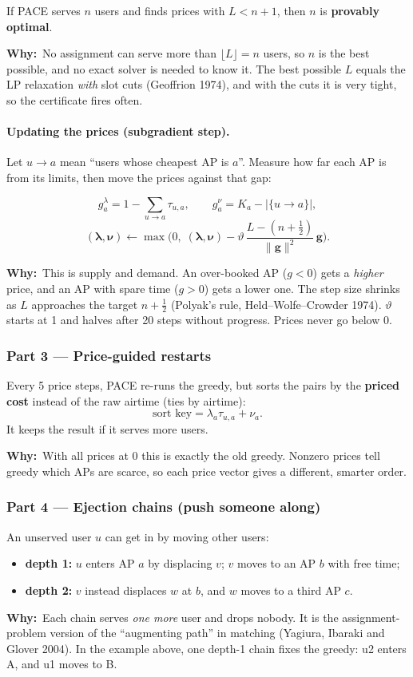 \documentclass[11pt,a4paper]{article}
\newcommand{\why}[1]{\par\smallskip\noindent\begin{minipage}{\linewidth}\small
  \textcolor{whyc}{\textbf{Why:}}~#1\end{minipage}\par\medskip}
\begin{document}
\begin{keybox}
If PACE serves $n$ users and finds prices with $L<n+1$, then $n$ is \textbf{provably optimal}.
\end{keybox}
\why{No assignment can serve more than $\lfloor L\rfloor=n$ users, so $n$ is the best possible, and no exact solver is needed to know it. The best possible $L$ equals the LP relaxation \emph{with} slot cuts (Geoffrion 1974), and with the cuts it is very tight, so the certificate fires often.}

\paragraph{Updating the prices (subgradient step).}
Let $u\to a$ mean ``users whose cheapest AP is $a$''. Measure how far each AP is from its
limits, then move the prices against that gap:
\begin{keybox}
\[
g^{\lambda}_a=1-\sum_{u\to a}\tau_{u,a},\qquad
g^{\nu}_a=K_a-\big|\{u\to a\}\big|,
\]
\[
(\boldsymbol\lambda,\boldsymbol\nu)\leftarrow
\max\!\Big(0,\;(\boldsymbol\lambda,\boldsymbol\nu)-\vartheta\,\frac{L-(n+\tfrac12)}{\lVert\mathbf g\rVert^2}\,\mathbf g\Big).
\]
\end{keybox}
\why{This is supply and demand. An over-booked AP ($g<0$) gets a \emph{higher} price, and an AP with spare time ($g>0$) gets a lower one. The step size shrinks as $L$ approaches the target $n+\tfrac12$ (Polyak's rule, Held--Wolfe--Crowder 1974). $\vartheta$ starts at 1 and halves after 20 steps without progress. Prices never go below 0.}

\subsubsection*{Part 3 --- Price-guided restarts}
Every 5 price steps, PACE re-runs the greedy, but sorts the pairs by the \textbf{priced cost}
instead of the raw airtime (ties by airtime):
\[
\text{sort key}=\lambda_a\tau_{u,a}+\nu_a .
\]
It keeps the result if it serves more users.
\why{With all prices at 0 this is exactly the old greedy. Nonzero prices tell greedy which APs are scarce, so each price vector gives a different, smarter order.}

\subsubsection*{Part 4 --- Ejection chains (push someone along)}
An unserved user $u$ can get in by moving other users:
\begin{itemize}
\item \textbf{depth 1:} $u$ enters AP $a$ by displacing $v$; $v$ moves to an AP $b$ with free time;
\item \textbf{depth 2:} $v$ instead displaces $w$ at $b$, and $w$ moves to a third AP $c$.
\end{itemize}
\why{Each chain serves \emph{one more} user and drops nobody. It is the assignment-problem version of the ``augmenting path'' in matching (Yagiura, Ibaraki and Glover 2004). In the example above, one depth-1 chain fixes the greedy: u2 enters A, and u1 moves to B.}
\end{document}
